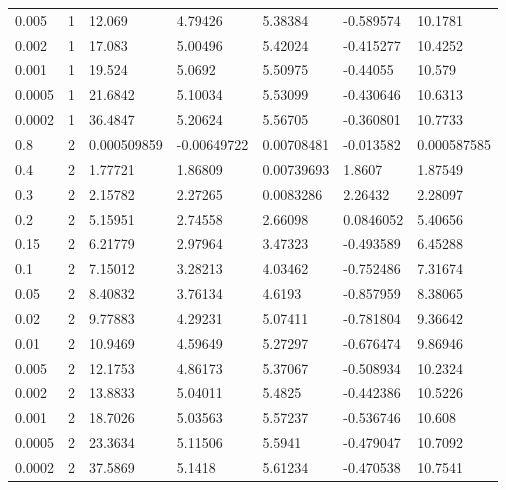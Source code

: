\begin{tabular}{lllllll}
0.005 & 1 & 12.069 & 4.79426 & 5.38384 & -0.589574 & 10.1781 \\
0.002 & 1 & 17.083 & 5.00496 & 5.42024 & -0.415277 & 10.4252 \\
0.001 & 1 & 19.524 & 5.0692 & 5.50975 & -0.44055 & 10.579 \\
0.0005 & 1 & 21.6842 & 5.10034 & 5.53099 & -0.430646 & 10.6313 \\
0.0002 & 1 & 36.4847 & 5.20624 & 5.56705 & -0.360801 & 10.7733 \\
0.8 & 2 & 0.000509859 & -0.00649722 & 0.00708481 & -0.013582 & 0.000587585 \\
0.4 & 2 & 1.77721 & 1.86809 & 0.00739693 & 1.8607 & 1.87549 \\
0.3 & 2 & 2.15782 & 2.27265 & 0.0083286 & 2.26432 & 2.28097 \\
0.2 & 2 & 5.15951 & 2.74558 & 2.66098 & 0.0846052 & 5.40656 \\
0.15 & 2 & 6.21779 & 2.97964 & 3.47323 & -0.493589 & 6.45288 \\
0.1 & 2 & 7.15012 & 3.28213 & 4.03462 & -0.752486 & 7.31674 \\
0.05 & 2 & 8.40832 & 3.76134 & 4.6193 & -0.857959 & 8.38065 \\
0.02 & 2 & 9.77883 & 4.29231 & 5.07411 & -0.781804 & 9.36642 \\
0.01 & 2 & 10.9469 & 4.59649 & 5.27297 & -0.676474 & 9.86946 \\
0.005 & 2 & 12.1753 & 4.86173 & 5.37067 & -0.508934 & 10.2324 \\
0.002 & 2 & 13.8833 & 5.04011 & 5.4825 & -0.442386 & 10.5226 \\
0.001 & 2 & 18.7026 & 5.03563 & 5.57237 & -0.536746 & 10.608 \\
0.0005 & 2 & 23.3634 & 5.11506 & 5.5941 & -0.479047 & 10.7092 \\
0.0002 & 2 & 37.5869 & 5.1418 & 5.61234 & -0.470538 & 10.7541 \\
\bottomrule
\end{tabular}
